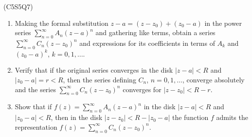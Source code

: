 \begin{prb}
    (C5S5Q7) 
    \begin{enumerate}
        \item[a)] Making the formal substitution $z - a = (z - z_0) + (z_0 - a)$ in the power series $\sum_{n=0}^{\infty} A_n(z - a)^n$ and gathering like terms, obtain a series $\sum_{n=0}^{\infty} C_n(z - z_0)^n$ and expressions for its coefficients in terms of $A_k$ and $(z_0 - a)^k$, $k = 0, 1, \ldots$.
        \item[b)] Verify that if the original series converges in the disk $|z - a| < R$ and $|z_0 - a| = r < R$, then the series defining $C_n$, $n = 0, 1, \ldots$, converge absolutely and the series $\sum_{n=0}^{\infty} C_n(z - z_0)^n$ converges for $|z - z_0| < R - r$.
        \item[c)] Show that if $f(z) = \sum_{n=0}^{\infty} A_n(z - a)^n$ in the disk $|z - a| < R$ and $|z_0 - a| < R$, then in the disk $|z - z_0| < R - |z_0 - a|$ the function $f$ admits the representation $f(z) = \sum_{n=0}^{\infty} C_n(z - z_0)^n$.
    \end{enumerate}
\end{prb}
